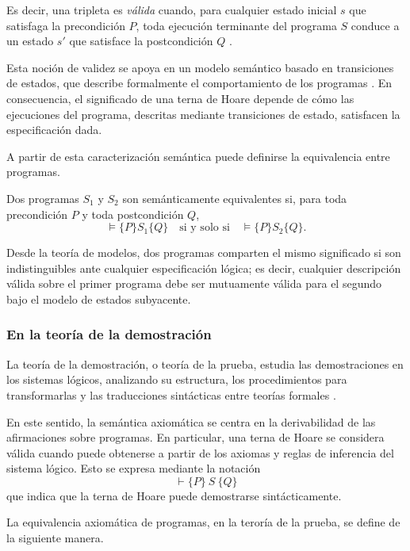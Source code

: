Es decir, una tripleta es \emph{válida} cuando, para cualquier estado inicial \(s\) que satisfaga la precondición \(P\), toda ejecución terminante del programa \(S\) conduce a un estado \(s'\) que satisface la postcondición \(Q\) \cite{winskel1993formal}.

Esta noción de validez se apoya en un modelo semántico basado en transiciones de estados, que describe formalmente el comportamiento de los programas \cite{Pierce:SF2}. En consecuencia, el significado de una terna de Hoare depende de cómo las ejecuciones del programa, descritas mediante transiciones de estado, satisfacen la especificación dada.


A partir de esta caracterización semántica puede definirse la equivalencia entre programas.

\begin{definition}
Dos programas $S_1$ y $S_2$ son semánticamente equivalentes si, para toda precondición $P$ y toda postcondición $Q$,
\[
\vDash \{P\} S_1 \{Q\}
\quad \text{si y solo si} \quad
\vDash \{P\} S_2 \{Q\}.
\]
\end{definition}

Desde la teoría de modelos, dos programas comparten el mismo significado si son indistinguibles ante cualquier especificación lógica; es decir, cualquier descripción válida sobre el primer programa debe ser mutuamente válida para el segundo bajo el modelo de estados subyacente. 


\subsubsection{En la teoría de la demostración}

La teoría de la demostración, o teoría de la prueba, estudia las demostraciones en los sistemas lógicos, analizando su estructura, los procedimientos para transformarlas y las traducciones sintácticas entre teorías formales \cite{TroelstraSchwichtenberg2000}.

En este sentido, la semántica axiomática se centra en la derivabilidad de las afirmaciones sobre programas. En particular, una terna de Hoare se considera válida cuando puede obtenerse a partir de los axiomas y reglas de inferencia del sistema lógico. Esto se expresa mediante la notación
\[
\vdash \{P\}\ S\ \{Q\}
\]
que indica que la terna de Hoare puede demostrarse sintácticamente.

La equivalencia axiomática de programas, en la teroría de la prueba, se define de la siguiente manera.

